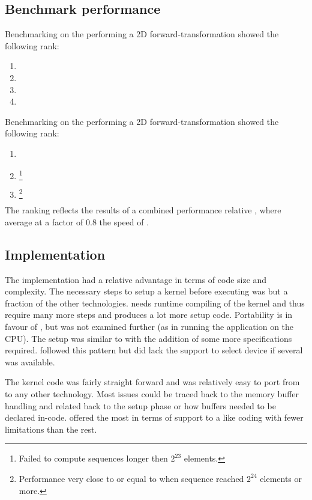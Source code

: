 \subsection{Benchmark performance}

Benchmarking on the {\NVCARD} performing a \gls{2D} forward-transformation showed the following rank:
\begin{enumerate}	
	\item {\CU}
	\item {\DX}
	\item {\GL}
	\item {\OCL}
\end{enumerate}

Benchmarking on the {\AMDCARD} performing a \gls{2D} forward-transformation showed the following rank:
\begin{enumerate}	
	\item {\DX}
	\item {\GL}\footnote{Failed to compute sequences longer then $2^{23}$ elements.}
	\item {\OCL}\footnote{Performance very close to or equal to {\DX} when sequence reached $2^{24}$ elements or more.}
\end{enumerate}
The ranking reflects the results of a combined performance relative {\OCL}, where {\DX} average at a factor of $0.8$ the speed of {\OCL}.

\subsection{Implementation}

The {\CU} implementation had a relative advantage in terms of code size and complexity. The necessary steps to setup a kernel before executing was but a fraction of the other technologies. {\OCL} needs runtime compiling of the kernel and thus require many more steps and produces a lot more setup code. Portability is in favour of {\OCL}, but was not examined further (as in running the application on the \gls{CPU}). The {\DX} setup was similar to {\OCL} with the addition of some more specifications required. {\GL} followed this pattern but did lack the support to select device if several was available.

The kernel code was fairly straight forward and was relatively easy to port from {\CU} to any other technology. Most issues could be traced back to the memory buffer handling and related back to the setup phase or how buffers needed to be declared in-code. {\CU} offered the most in terms of support to a {\CPP} like coding with fewer limitations than the rest.

